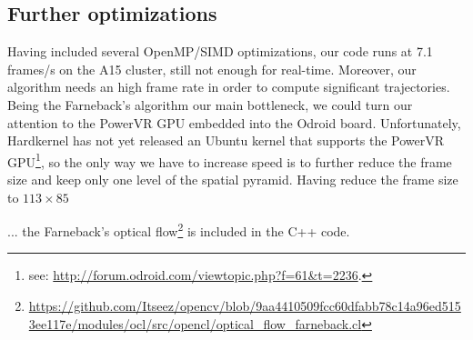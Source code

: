 \subsection{Further optimizations}
Having included several OpenMP/SIMD optimizations, our code runs at 7.1 frames/s on the A15 cluster, still not enough for real-time. Moreover, our algorithm needs an high frame rate in order to compute significant trajectories. Being the Farneback's algorithm our main bottleneck, we could turn our attention to the PowerVR GPU embedded into the Odroid board. Unfortunately, Hardkernel has not yet released an Ubuntu kernel that supports the PowerVR GPU\footnote{see: \url{http://forum.odroid.com/viewtopic.php?f=61&t=2236}.}, so the only way we have to increase speed is to further reduce the frame size and keep only one level of the spatial pyramid. Having reduce the frame size to $113\times 85$


... the Farneback's optical flow\footnote{\url{https://github.com/Itseez/opencv/blob/9aa4410509fcc60dfabb78c14a96ed5153ee117e/modules/ocl/src/opencl/optical_flow_farneback.cl}} is included in the C++ code.
